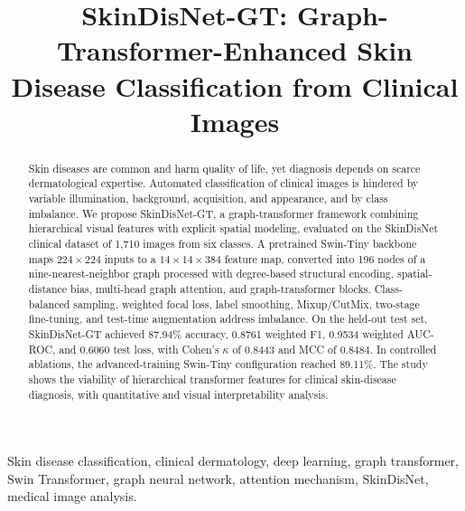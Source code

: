 \documentclass[conference]{IEEEtran}
\begin{document}
\title{SkinDisNet-GT: Graph-Transformer-Enhanced Skin Disease Classification from Clinical Images}

\author{
}

\maketitle

\begin{abstract}
Skin diseases are common and harm quality of life, yet diagnosis depends on scarce dermatological expertise. Automated classification of clinical images is hindered by variable illumination, background, acquisition, and appearance, and by class imbalance. We propose SkinDisNet-GT, a graph-transformer framework combining hierarchical visual features with explicit spatial modeling, evaluated on the SkinDisNet clinical dataset of 1,710 images from six classes. A pretrained Swin-Tiny backbone maps $224\times224$ inputs to a $14\times14\times384$ feature map, converted into 196 nodes of a nine-nearest-neighbor graph processed with degree-based structural encoding, spatial-distance bias, multi-head graph attention, and graph-transformer blocks. Class-balanced sampling, weighted focal loss, label smoothing, Mixup/CutMix, two-stage fine-tuning, and test-time augmentation address imbalance. On the held-out test set, SkinDisNet-GT achieved 87.94\% accuracy, 0.8761 weighted F1, 0.9534 weighted AUC-ROC, and 0.6060 test loss, with Cohen's $\kappa$ of 0.8443 and MCC of 0.8484. In controlled ablations, the advanced-training Swin-Tiny configuration reached 89.11\%. The study shows the viability of hierarchical transformer features for clinical skin-disease diagnosis, with quantitative and visual interpretability analysis.
\end{abstract}

\begin{IEEEkeywords}
Skin disease classification, clinical dermatology, deep learning, graph transformer, Swin Transformer, graph neural network, attention mechanism, SkinDisNet, medical image analysis.
\end{IEEEkeywords}
\end{document}
